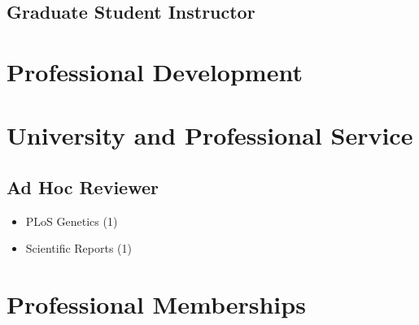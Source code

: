 \documentclass[11pt, a4paper]{awesome-cv}
\providecommand{\tightlist}{%
	\setlength{\itemsep}{0pt}\setlength{\parskip}{0pt}}
\begin{document}
\hypertarget{graduate-student-instructor}{%
\subsection{Graduate Student
Instructor}\label{graduate-student-instructor}}

\hypertarget{professional-development}{%
\section{Professional Development}\label{professional-development}}

\hypertarget{university-and-professional-service}{%
\section{University and Professional
Service}\label{university-and-professional-service}}

\hypertarget{ad-hoc-reviewer}{%
\subsection{Ad Hoc Reviewer}\label{ad-hoc-reviewer}}

\begin{itemize}
\tightlist
\item
  PLoS Genetics (1)
\item
  Scientific Reports (1)
\end{itemize}

\hypertarget{professional-memberships}{%
\section{Professional Memberships}\label{professional-memberships}}
\end{document}
